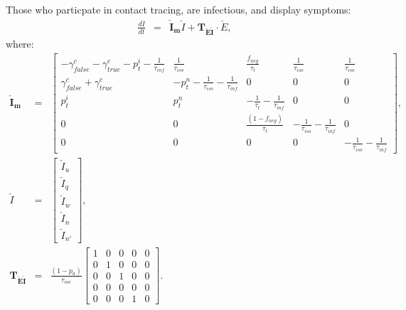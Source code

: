 \documentclass[notitlepage, superscriptaddress]{revtex4-2}
\begin{document}
Those who particpate in contact tracing, are infectious, and display symptoms:
\begin{eqnarray}
\frac{d\check{I}}{dt} &=& \boldsymbol{\check{I}_{m}}  \check{I} + \boldsymbol{T_{\check{E}\check{I}}} \cdot  \check{E}, 
\end{eqnarray}
where:
%
\begin{eqnarray}
\boldsymbol{\check{I}_{m}} &=&
\begin{bmatrix}
 -\gamma^{c}_{false} -\gamma^{c}_{true} - p^{i}_{t} -\frac{1}{\tau_{inf}} & \frac{1}{\tau_{iso}}  & \frac{f_{neg}}{\tau_{t}} & \frac{1}{\tau_{iso}} & \frac{1}{\tau_{iso}} \\
\gamma^{c}_{false} + \gamma^{c}_{true}    &  -p^{n}_{t}  - \frac{1}{\tau_{iso}} - \frac{1}{\tau_{inf}}      &  0    & 0  & 0\\
p^{i}_{t}     &  p^{n}_{t}                  &  -\frac{1}{\tau_{t}}  - \frac{1}{\tau_{inf}}  & 0 & 0\\
0 & 0 & \frac{(1-f_{neg})}{\tau_{t}}  & -\frac{1}{\tau_{iso}}  -  \frac{1}{\tau_{inf}} & 0 \\ 
0 & 0 & 0 & 0 & -\frac{1}{\tau_{iso}}  -  \frac{1}{\tau_{inf}}
\end{bmatrix}, \\ 
%
\check{I} &=& 
\begin{bmatrix}
\check{I}_{u} \\ \check{I}_{q} \\ \check{I}_{w}\\ \check{I}_{n} \\ \check{I}_{n'}
\end{bmatrix}, \\
%
\boldsymbol{T_{\check{E}\check{I}}} &=& \frac{(1-p_{a})}{\tau_{inc}} 
\begin{bmatrix}
1  & 0 & 0 & 0 & 0\\ 
0  & 1 & 0 & 0 & 0 \\ 
0  & 0 & 1 & 0 & 0 \\ 
0  & 0 & 0 & 0 & 0 \\ 
0  & 0 & 0 & 1 & 0 
\end{bmatrix}.
\end{eqnarray}

\end{document}
